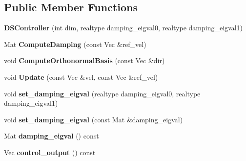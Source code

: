 \subsection*{Public Member Functions}
\begin{DoxyCompactItemize}
\item 
\hypertarget{classDSController_a58f137f5163f7e5446ed3bbb6f51dd84}{{\bfseries D\+S\+Controller} (int dim, realtype damping\+\_\+eigval0, realtype damping\+\_\+eigval1)}\label{classDSController_a58f137f5163f7e5446ed3bbb6f51dd84}

\item 
\hypertarget{classDSController_a16d6380a8cd8be3b50742770c5d1b469}{Mat {\bfseries Compute\+Damping} (const Vec \&ref\+\_\+vel)}\label{classDSController_a16d6380a8cd8be3b50742770c5d1b469}

\item 
\hypertarget{classDSController_ad378ee521f62f3832781bf9341dadb3e}{void {\bfseries Compute\+Orthonormal\+Basis} (const Vec \&dir)}\label{classDSController_ad378ee521f62f3832781bf9341dadb3e}

\item 
\hypertarget{classDSController_a8a7fc8de1b4fa9aa5e53d00f02c1a8ef}{void {\bfseries Update} (const Vec \&vel, const Vec \&ref\+\_\+vel)}\label{classDSController_a8a7fc8de1b4fa9aa5e53d00f02c1a8ef}

\item 
\hypertarget{classDSController_ab08bcc5c458aa127c1527f21f4525de8}{void {\bfseries set\+\_\+damping\+\_\+eigval} (realtype damping\+\_\+eigval0, realtype damping\+\_\+eigval1)}\label{classDSController_ab08bcc5c458aa127c1527f21f4525de8}

\item 
\hypertarget{classDSController_a33a08c811cc77253674951282221ee92}{void {\bfseries set\+\_\+damping\+\_\+eigval} (const Mat \&damping\+\_\+eigval)}\label{classDSController_a33a08c811cc77253674951282221ee92}

\item 
\hypertarget{classDSController_aa0ac90880dc0e6a379da8545fe909bc1}{Mat {\bfseries damping\+\_\+eigval} () const }\label{classDSController_aa0ac90880dc0e6a379da8545fe909bc1}

\item 
\hypertarget{classDSController_ab9be9f5e11c3b57b3263334fe2ee91a0}{Vec {\bfseries control\+\_\+output} () const }\label{classDSController_ab9be9f5e11c3b57b3263334fe2ee91a0}

\end{DoxyCompactItemize}
